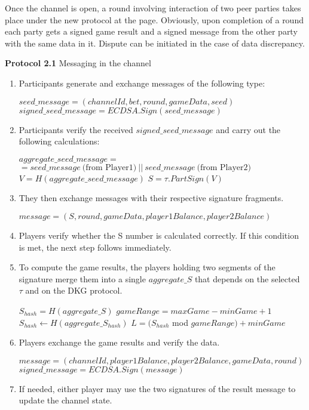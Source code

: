 Once the channel is open, a round involving interaction of two peer parties takes place under the new protocol at the \pageref{intchannel1} page. Obviously, upon completion of a round each party gets a signed game result and a signed message from the other party with the same data in it. Dispute can be initiated in the case of data discrepancy.
\begin{algorithm} 
\caption*{\textbf{Protocol 2.1} Messaging in the channel}
\begin{enumerate}
	\item Participants generate and exchange messages of the following type:
 \label{intchannel1}
\begin{center}
$ seed\_message = (channelId, bet, round, gameData, seed)$
$signed\_seed\_message = ECDSA.Sign(seed\_message)$ 
\end{center}
	\item Participants verify the received $signed\_seed\_message$ and carry out the following calculations:
 \begin{algorithmic}
\State $aggregate\_seed\_message =$ \\ $= seed\_message \  \text{(from Player1)} \ ||  \ seed\_message \  \text{(from Player2)}$
\State $V = H(aggregate\_seed\_message)$
\State $S =  \tau .PartSign(V)$
 \end{algorithmic}
\item They then exchange messages with their respective signature fragments.
\begin{center}
 $message = (S, round, gameData, player1Balance, player2Balance)$
\end{center}
	\item Players verify whether the S number is calculated correctly. If this condition is met, the next step follows immediately.
	\item To compute the game results, the players holding two segments of the signature merge them into a single $aggregate\_S$ that depends on the selected  $\tau$ and on the DKG protocol.
\begin{algorithmic}
\State $S_{hash} = H(aggregate\_S)$
\State $gameRange = maxGame -  minGame + 1$
\State$ S_{hash}\gets H(aggregate\_S_{hash})$
\EndWhile
\State $L = (S_{hash}$ mod $gameRange) + minGame$
\end{algorithmic}
\end{enumerate}
\end{algorithm}
\begin{algorithm}
\begin{enumerate}
\setcounter{enumi}{5}
 \item Players exchange the game results and verify the data. 
\begin{center}
 $message = (channelId, player1Balance, player2Balance, gameData, round)$
 $signed\_message = ECDSA.Sign(message)$
\end{center}
\item If needed, either player may use the two signatures of the result message to update the channel state.
\end{enumerate}
\end{algorithm}

